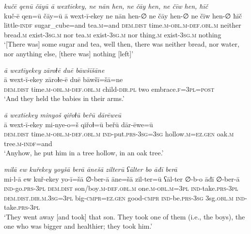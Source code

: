 \ea \label{ZB.29}
\textit{kučē qenū čāyū ā wextīekey, ne nān hen, ne čāy hen, ne čīw hen, ħīč} \\ 
\gll kuč-ē qen=ū čāy=ū ā wext-ī-ekey ne nān hen-∅ ne čāy hen-∅ ne čīw hen-∅ ħīč \\ 
 little\textsc{-indf} sugar\_cube=and tea\textsc{.m}=and \textsc{dem.dist} time\textsc{.m}\textsc{-obl}\textsc{.m}\textsc{-def}\textsc{.obl}\textsc{.m} neither bread\textsc{.m} exist\textsc{-3sg}\textsc{.m} nor tea\textsc{.m} exist\textsc{-3sg}\textsc{.m} nor thing\textsc{.m} exist\textsc{-3sg}\textsc{.m} nothing \\ 
\glt `[There was] some sugar and tea, well then, there was neither bread, nor water, nor anything else, [there was] nothing [left]'
\z 
 
\ea \label{ZB.32}
\textit{ā wextīyekey zāroɫē duē bāwšīšāne} \\ 
\gll ā wext-ī-ekey zāroɫe-ē duē bāwšī=šā=ne \\ 
 \textsc{dem.dist} time\textsc{.m}\textsc{-obl}\textsc{.m}\textsc{-def}\textsc{.obl}\textsc{.m} child\textsc{-dir}\textsc{.pl} two embrace\textsc{.f}\textsc{=3pl}\textsc{=\textsc{post}} \\ 
\glt `And they held the babies in their arms.'
\z 
 
\ea \label{ZB.38}
\textit{ā wextīekey minyoš qiřoɫū beřū dārēweū} \\ 
\gll ā wext-ī-ekey mi-nye-o=š qiřoɫ=ū beřū dār-ēwe=ū \\ 
 \textsc{dem.dist} time\textsc{.m}\textsc{-obl}\textsc{.m}\textsc{-def}\textsc{.obl}\textsc{.m} \textsc{ind-}put\textsc{.prs}\textsc{-3sg}\textsc{=3sg} hollow\textsc{.m}\textsc{\textsc{=ez.gen}} oak\textsc{.m} tree\textsc{.m}\textsc{-indf}=and \\ 
\glt `Anyhow, he put him in a tree hollow, in an oak tree.'
\z 
 
\ea \label{ZB.40}
\textit{milā ew kuřekey yoyšā berā ānešā zilterū ʕālter bo āđī berā} \\ 
\gll mi-l-ā ew kuř-ekey yo-ī=šā ∅-ber-ā āne=šā zil-ter=ū ʕāl-ter ∅-b-o āđī ∅-ber-ā \\ 
 \textsc{ind-}go\textsc{.prs}\textsc{-3pl} \textsc{dem.dist} son/boy\textsc{.m}\textsc{-def}\textsc{.obl}\textsc{.m} one\textsc{.m}\textsc{-obl}\textsc{.m}\textsc{=3pl} \textsc{ind-}take\textsc{.prs}\textsc{-3pl} \textsc{dem.dist}\textsc{.dir}\textsc{.m}\textsc{.3sg}\textsc{=3pl} big\textsc{-cmpr}\textsc{\textsc{=ez.gen}} good\textsc{-cmpr} \textsc{ind-}be\textsc{.prs}\textsc{-3sg} 3sg\textsc{.obl}\textsc{.m} \textsc{ind-}take\textsc{.prs}\textsc{-3pl} \\ 
\glt `They went away [and took] that son. They took one of them (i.e., the boys), the one who was bigger and healthier; they took him.'
\z 
 
